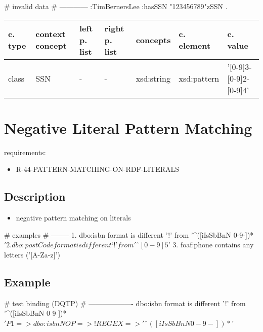 \documentclass{llncs}
\newenvironment{gcotable}{
  \scriptsize
  \sffamily
  \vspace{0.3cm}
  \begin{tabular}{l|l|l|l|l|l|l}
  \hline
  \textbf{c. type} & \textbf{context concept} & \textbf{left p. list} & \textbf{right p. list} & \textbf{concepts} & \textbf{c. element} & \textbf{c. value} \\
  \hline

}{
  \hline
  \end{tabular}
  \linebreak
}
\begin{document}
\begin{ex}
# invalid data
# ------------
:TimBernersLee
    :hasSSN "123456789"^^:SSN .
\end{ex}

\begin{gcotable}
class & SSN & - & - & xsd:string & xsd:pattern & '[0-9]{3}-[0-9]{2}-[0-9]{4}' \\
\end{gcotable}

\section{Negative Literal Pattern Matching}

requirements:

\begin{itemize}
  \item R-44-PATTERN-MATCHING-ON-RDF-LITERALS
\end{itemize}

\subsection{Description}

\begin{itemize}
	\item negative pattern matching on literals
\end{itemize}

\begin{ex}
# examples
# --------
1. dbo:isbn format is different ’!’ from '^([iIsSbBnN 0-9-])*$'
2. dbo:postCode format is different ‘!’ from 'ˆ[0-9]{5}$'
3. foaf:phone contains any letters ('[A-Za-z]')
\end{ex}

\subsection{Example}

\begin{ex}
# test binding (DQTP)
# -------------------
dbo:isbn format is different ’!’ from '^([iIsSbBnN 0-9-])*$'

P1 => dbo:isbn
NOP => !
REGEX => 'ˆ([iIsSbBnN 0-9-])*$'
\end{ex}

\end{document}
